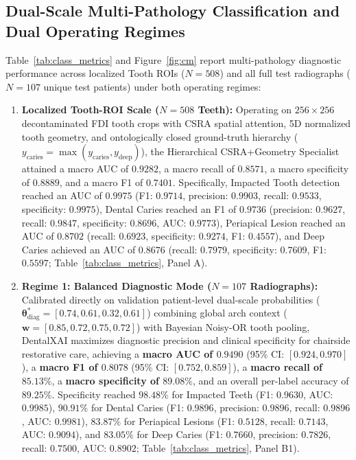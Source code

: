 \documentclass[review]{elsarticle}
\begin{document}
\subsection{Dual-Scale Multi-Pathology Classification and Dual Operating Regimes}
Table~\ref{tab:class_metrics} and Figure~\ref{fig:cm} report multi-pathology diagnostic performance across localized Tooth ROIs ($N=508$) and all full test radiographs ($N=107$ unique test patients) under both operating regimes:
\begin{enumerate}
    \item \textbf{Localized Tooth-ROI Scale ($N=508$ Teeth):} Operating on $256 \times 256$ decontaminated FDI tooth crops with CSRA spatial attention, 5D normalized tooth geometry, and ontologically closed ground-truth hierarchy ($y_{\text{caries}} = \max(y_{\text{caries}}, y_{\text{deep}})$), the Hierarchical CSRA+Geometry Specialist attained a macro AUC of \textbf{$0.9282$}, a macro recall of \textbf{$0.8571$}, a macro specificity of \textbf{$0.8889$}, and a macro F1 of \textbf{$0.7401$}. Specifically, Impacted Tooth detection reached an AUC of $\mathbf{0.9975}$ (F1: $0.9714$, precision: $0.9903$, recall: $0.9533$, specificity: $0.9975$), Dental Caries reached an F1 of $\mathbf{0.9736}$ (precision: $0.9627$, recall: $0.9847$, specificity: $0.8696$, AUC: $0.9773$), Periapical Lesion reached an AUC of $\mathbf{0.8702}$ (recall: $0.6923$, specificity: $0.9274$, F1: $0.4557$), and Deep Caries achieved an AUC of $\mathbf{0.8676}$ (recall: $0.7979$, specificity: $0.7609$, F1: $0.5597$; Table~\ref{tab:class_metrics}, Panel A).
    \item \textbf{Regime 1: Balanced Diagnostic Mode ($N=107$ Radiographs):} Calibrated directly on validation patient-level dual-scale probabilities ($\boldsymbol{\theta}^*_{\text{diag}} = [0.74, 0.61, 0.32, 0.61]$) combining global arch context ($\mathbf{w} = [0.85, 0.72, 0.75, 0.72]$) with Bayesian Noisy-OR tooth pooling, DentalXAI maximizes diagnostic precision and clinical specificity for chairside restorative care, achieving a \textbf{macro AUC of $0.9490$} (95\% CI: $[0.924, 0.970]$), a \textbf{macro F1 of $0.8078$} (95\% CI: $[0.752, 0.859]$), a \textbf{macro recall of $85.13\%$}, a \textbf{macro specificity of $89.08\%$}, and an overall per-label accuracy of \textbf{$89.25\%$}. Specificity reached \textbf{$98.48\%$} for Impacted Teeth (F1: $0.9630$, AUC: $0.9985$), \textbf{$90.91\%$} for Dental Caries (F1: $0.9896$, precision: $0.9896$, recall: $0.9896$, AUC: $0.9981$), \textbf{$83.87\%$} for Periapical Lesions (F1: $0.5128$, recall: $0.7143$, AUC: $0.9094$), and \textbf{$83.05\%$} for Deep Caries (F1: $0.7660$, precision: $0.7826$, recall: $0.7500$, AUC: $0.8902$; Table~\ref{tab:class_metrics}, Panel B1).

\end{enumerate}
\end{document}
